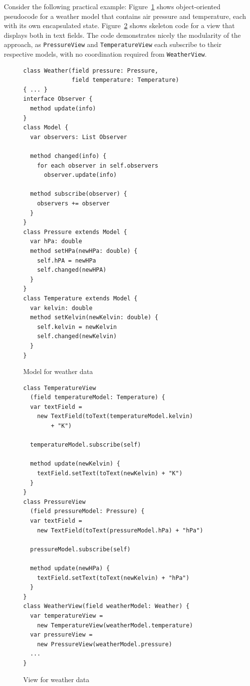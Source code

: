 \documentclass[sigplan,review,screen]{acmart}
\begin{document}
%
%
Consider the following practical example:
Figure~\ref{fig:weather-model} shows object-oriented pseudocode for a
weather model that contains air pressure and temperature, each with
its own encapsulated state.  Figure~\ref{fig:weather-view} shows
skeleton code for a view that displays both in text fields.  The code
demonstrates nicely the modularity of the approach, as
\texttt{PressureView} and \texttt{TemperatureView} each subscribe to
their respective models, with no coordination required from
\texttt{WeatherView}.

\begin{figure}[tb]
\begin{verbatim}
class Weather(field pressure: Pressure,
              field temperature: Temperature)
{ ... }
interface Observer {
  method update(info)
}
class Model {
  var observers: List Observer

  method changed(info) {
    for each observer in self.observers
      observer.update(info)

  method subscribe(observer) {
    observers += observer
  }
}
class Pressure extends Model {
  var hPa: double
  method setHPa(newHPa: double) {
    self.hPA = newHPa
    self.changed(newHPA)
  }
}
class Temperature extends Model {
  var kelvin: double
  method setKelvin(newKelvin: double) {
    self.kelvin = newKelvin
    self.changed(newKelvin)
  }
}
\end{verbatim}
  \vspace*{-3ex}
  \caption{Model for weather data}
  \label{fig:weather-model}
\end{figure}

\begin{figure}[tb]
\begin{verbatim}
class TemperatureView
  (field temperatureModel: Temperature) {
  var textField =
    new TextField(toText(temperatureModel.kelvin)
        + "K")

  temperatureModel.subscribe(self)

  method update(newKelvin) {
    textField.setText(toText(newKelvin) + "K")
  }
}
class PressureView
  (field pressureModel: Pressure) {
  var textField =
    new TextField(toText(pressureModel.hPa) + "hPa")

  pressureModel.subscribe(self)

  method update(newHPa) {
    textField.setText(toText(newKelvin) + "hPa")
  }
}
class WeatherView(field weatherModel: Weather) {
  var temperatureView =
    new TemperatureView(weatherModel.temperature)
  var pressureView =
    new PressureView(weatherModel.pressure)
  ...
}
\end{verbatim}
  \vspace*{-2ex}
  \caption{View for weather data}
  \label{fig:weather-view}
\end{figure}
\end{document}
